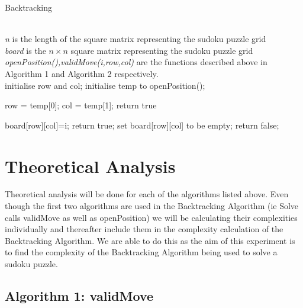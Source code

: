 \documentclass[12pt,a4paper,titlepage]{article}
\begin{document}

\begin{algorithm}[H]
\caption{Backtracking}
\begin{algorithmic}[1]
\\
\textit{n} is the length of the square matrix representing the sudoku puzzle grid 
\\
\textit{board} is the $n \times n$ square matrix representing the sudoku puzzle grid
\\
\textit{openPosition(),validMove(i,row,col)} are the functions described above in Algorithm 1 and Algorithm 2 respectively.
\\ 
	\State initialise row and col; 
	\State initialise temp to openPosition();	

		\State row = temp[0];
		\State col = temp[1];
  	\Else
		\State return true
	\EndIf  
	
			\State board[row][col]=i;
       			\State return true;
       		\EndIf       
			\State set board[row][col] to be empty;
		\EndIf
	\EndFor
	\State  return false;
\EndFunction

\end{algorithmic}
\end{algorithm}

\section{Theoretical Analysis }

Theoretical analysis will be done for each of the algorithms listed above. Even though the first two algorithms are used in the Backtracking Algorithm (ie Solve calls validMove as well as openPosition) we will be calculating their complexities individually and thereafter include them in the complexity calculation of the Backtracking Algorithm. We are able to do this as the aim of this experiment is to find the complexity of the Backtracking Algorithm being used to solve a sudoku puzzle.

\subsection{Algorithm 1: validMove}
 
\end{document}
